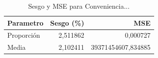 \begin{table}

\caption{Sesgo y MSE para Conveniencia...}
\centering
\begin{tabular}[t]{lrr}
\toprule
Parametro & Sesgo (\%) & MSE\\
\midrule
Proporción & 2,511862 & 0,000727\\
Media & 2,102411 & 39371454607,834885\\
\bottomrule
\end{tabular}
\end{table}
